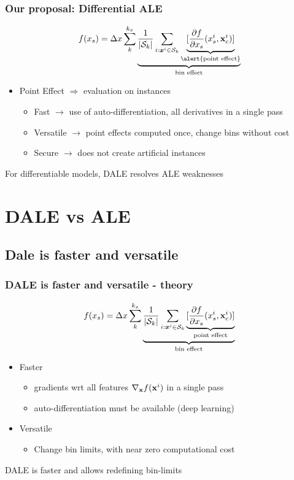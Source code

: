 \begin{frame}
  \frametitle{Our proposal: Differential ALE}
  \begin{equation*}
    f(x_s) = \Delta x \sum_k^{k_x} \underbrace{\frac{1}{|\mathcal{S}_k|}
      \sum_{i:\xb^i \in \mathcal{S}_k} \underbrace{[\frac{\partial f}{\partial
            x_s}(x_s^i, \Vx^i_c)]}_{\text{\alert{point effect}}}}_{\text{bin effect}}
  \end{equation*}

  \begin{itemize}
  \item Point Effect \(\Rightarrow\) evaluation \alert{on instances}
    \begin{itemize}
    \item Fast \( \rightarrow \) use of auto-differentiation, all derivatives in a single pass
    \item Versatile \( \rightarrow\) point effects computed once, change bins without cost
    \item Secure \( \rightarrow\) does not create artificial instances
    \end{itemize}
  \end{itemize}

  \noindent\makebox[\linewidth]{\rule{\paperwidth}{0.4pt}}
  For \alert{differentiable} models, DALE resolves ALE weaknesses
\end{frame}



\section{DALE vs ALE}

\subsection{Dale is faster and versatile}

\begin{frame}
  \frametitle{DALE is faster and versatile - theory}
  \[f(x_s) = \Delta x \sum_k^{k_x} \underbrace{\frac{1}{|\mathcal{S}_k|} \sum_{i:\boldsymbol{x}^i \in \mathcal{S}_k} \underbrace{[\frac{\partial f}{\partial x_s}(x_s^i, \mathbf{x}^i_c)]}_{\text{point effect}}}_{\text{bin effect}} \]

  \begin{itemize}
  \item Faster
    \begin{itemize}
    \item gradients wrt all features \(\nabla_{\mathbf{x}} f(\mathbf{x}^i)\) in a single pass
    \item auto-differentiation must be available (deep learning)
    \end{itemize}
  \item Versatile
    \begin{itemize}
    \item Change bin limits, with near zero computational cost
    \end{itemize}

  \end{itemize}
  \noindent\makebox[\linewidth]{\rule{\paperwidth}{0.4pt}}
  DALE is faster and allows redefining bin-limits
\end{frame}

